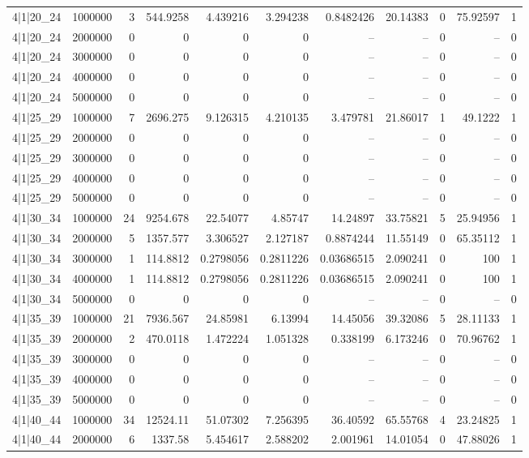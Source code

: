 \begin{tabular}{lrrrrrrrrrr}
4|1|20\_24 & 1000000 & 3 & 544.9258 & 4.439216 & 3.294238 & 0.8482426 & 20.14383 & 0 & 75.92597 & 1 \\
4|1|20\_24 & 2000000 & 0 & 0 & 0 & 0 & -- & -- & 0 & -- & 0 \\
4|1|20\_24 & 3000000 & 0 & 0 & 0 & 0 & -- & -- & 0 & -- & 0 \\
4|1|20\_24 & 4000000 & 0 & 0 & 0 & 0 & -- & -- & 0 & -- & 0 \\
4|1|20\_24 & 5000000 & 0 & 0 & 0 & 0 & -- & -- & 0 & -- & 0 \\
4|1|25\_29 & 1000000 & 7 & 2696.275 & 9.126315 & 4.210135 & 3.479781 & 21.86017 & 1 & 49.1222 & 1 \\
4|1|25\_29 & 2000000 & 0 & 0 & 0 & 0 & -- & -- & 0 & -- & 0 \\
4|1|25\_29 & 3000000 & 0 & 0 & 0 & 0 & -- & -- & 0 & -- & 0 \\
4|1|25\_29 & 4000000 & 0 & 0 & 0 & 0 & -- & -- & 0 & -- & 0 \\
4|1|25\_29 & 5000000 & 0 & 0 & 0 & 0 & -- & -- & 0 & -- & 0 \\
4|1|30\_34 & 1000000 & 24 & 9254.678 & 22.54077 & 4.85747 & 14.24897 & 33.75821 & 5 & 25.94956 & 1 \\
4|1|30\_34 & 2000000 & 5 & 1357.577 & 3.306527 & 2.127187 & 0.8874244 & 11.55149 & 0 & 65.35112 & 1 \\
4|1|30\_34 & 3000000 & 1 & 114.8812 & 0.2798056 & 0.2811226 & 0.03686515 & 2.090241 & 0 & 100 & 1 \\
4|1|30\_34 & 4000000 & 1 & 114.8812 & 0.2798056 & 0.2811226 & 0.03686515 & 2.090241 & 0 & 100 & 1 \\
4|1|30\_34 & 5000000 & 0 & 0 & 0 & 0 & -- & -- & 0 & -- & 0 \\
4|1|35\_39 & 1000000 & 21 & 7936.567 & 24.85981 & 6.13994 & 14.45056 & 39.32086 & 5 & 28.11133 & 1 \\
4|1|35\_39 & 2000000 & 2 & 470.0118 & 1.472224 & 1.051328 & 0.338199 & 6.173246 & 0 & 70.96762 & 1 \\
4|1|35\_39 & 3000000 & 0 & 0 & 0 & 0 & -- & -- & 0 & -- & 0 \\
4|1|35\_39 & 4000000 & 0 & 0 & 0 & 0 & -- & -- & 0 & -- & 0 \\
4|1|35\_39 & 5000000 & 0 & 0 & 0 & 0 & -- & -- & 0 & -- & 0 \\
4|1|40\_44 & 1000000 & 34 & 12524.11 & 51.07302 & 7.256395 & 36.40592 & 65.55768 & 4 & 23.24825 & 1 \\
4|1|40\_44 & 2000000 & 6 & 1337.58 & 5.454617 & 2.588202 & 2.001961 & 14.01054 & 0 & 47.88026 & 1 \\

\end{tabular}
